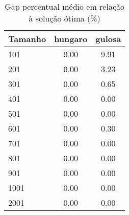 \begin{table}[htbp]
\centering
\caption{Gap percentual médio em relação à solução ótima (\%)}
\label{tab:gap_percentual_heuristica}
\begin{tabular}{lcc}
\toprule
Tamanho & hungaro & gulosa \\
\midrule
101 & 0.00 & 9.91 \\
201 & 0.00 & 3.23 \\
301 & 0.00 & 0.65 \\
401 & 0.00 & 0.00 \\
501 & 0.00 & 0.00 \\
601 & 0.00 & 0.30 \\
701 & 0.00 & 0.00 \\
801 & 0.00 & 0.00 \\
901 & 0.00 & 0.00 \\
1001 & 0.00 & 0.00 \\
2001 & 0.00 & 0.00 \\
\bottomrule
\end{tabular}
\end{table}
